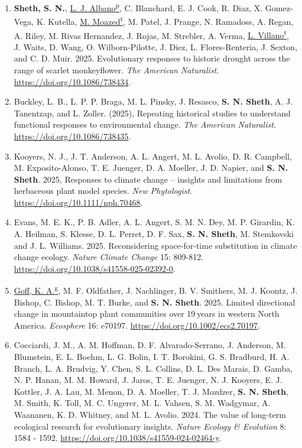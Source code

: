 \documentclass[11pt,english]{article}
\newcommand\reverselabel[1]{%
  \def\theenumi{}%
  \renewcommand\makelabel{\makebox[\dimexpr\labelwidth-3pt\relax][r]{%
    \the\numexpr#1-\value{enumi}+1\relax}}}%
\begin{document}
\begin{hangparas}{.5in}{1}
\begin{enumerate}
\reverselabel{37} %

\item \textbf{Sheth, S. N.}, \underline{L. J. Albano\textsuperscript{p}}, C. Blanchard, E. J. Cook, R. Diaz, X. Gomez-Vega, K. Kutella, \underline{M. Moazed\textsuperscript{t}}, M. Patel, J. Prange, N. Ramadoss, A. Regan, A. Riley, M. Rivas Hernandez, J. Rojas, M. Strebler, A. Verma, \underline{L. Villano\textsuperscript{t}}, J. Waits, D. Wang, O. Wilborn-Pilotte, J. Diez, L. Flores-Renteria, J. Sexton, and C. D. Muir. 2025. Evolutionary responses to historic drought across the range of scarlet monkeyflower. \emph{The American Naturalist}. \url{https://doi.org/10.1086/738434}.

\item Buckley, L. B., L. P. P. Braga, M. L. Pinsky, J. Resasco, \textbf{S. N. Sheth}, A. J. Tanentzap, and L. Zoller. (2025), Repeating historical studies to understand functional responses to environmental change. \emph{The American Naturalist}. \url{https://doi.org/10.1086/738435}.

\item Kooyers, N. J., J. T. Anderson, A. L. Angert, M. L. Avolio, D. R. Campbell, M. Exposito-Alonso, T. E. Juenger, D. A. Moeller, J. D. Napier, and \textbf{S. N. Sheth}. 2025, Responses to climate change – insights and limitations from herbaceous plant model species. \emph{New Phytologist}. \url{ https://doi.org/10.1111/nph.70468}.

\item Evans, M. E. K., P. B. Adler, A. L. Angert, S. M. N. Dey, M. P. Girardin, K. A. Heilman, S. Klesse, D. L. Perret, D. F. Sax, \textbf{S. N. Sheth}, M. Stemkovski and J. L. Williams. 2025. Reconsidering space-for-time substitution in climate change ecology. \emph{Nature Climate Change} 15: 809-812. \url{https://doi.org/10.1038/s41558-025-02392-0}.

\item \underline{Goff, K. A.\textsuperscript{g}}, M. F. Oldfather, J. Nachlinger, B. V. Smithers, M. J. Koontz, J. Bishop, C. Bishop, M. T. Burke, and \textbf{S. N. Sheth}. 2025. Limited directional change in mountaintop plant communities over 19 years in western North America. \emph{Ecosphere} 16: e70197. \url{https://doi.org/10.1002/ecs2.70197}.

\item Cocciardi, J. M., A. M. Hoffman, D. F. Alvarado-Serrano, J. Anderson, M. Blumstein, E. L. Boehm, L. G. Bolin, I. T. Borokini, G. S. Bradburd, H. A. Branch, L. A. Brudvig, Y. Chen, S. L. Collins, D. L. Des Marais, D. Gamba, N. P. Hanan, M. M. Howard, J. Jaros, T. E. Juenger, N. J. Kooyers, E. J. Kottler, J. A. Lau, M. Menon, D. A. Moeller, T. J. Mozdzer, \textbf{S. N. Sheth}, M. Smith, K. Toll, M. C. Ungerer, M. L. Vahsen, S. M. Wadgymar, A. Waananen, K. D. Whitney, and M. L. Avolio. 2024. The value of long-term ecological research for evolutionary insights. \emph{Nature Ecology \& Evolution} 8: 1584 - 1592. \url{https://doi.org/10.1038/s41559-024-02464-y}.


\end{enumerate}
\end{hangparas}
\end{document}
